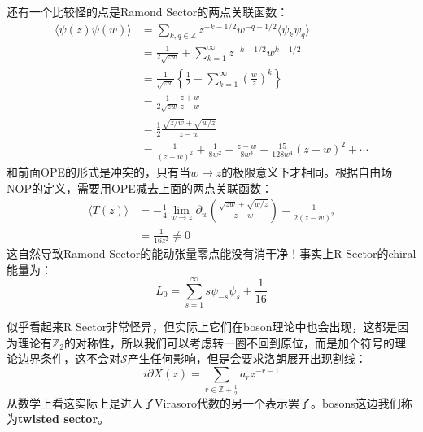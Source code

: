 还有一个比较怪的点是Ramond Sector的两点关联函数：
\begin{equation}
	\begin{aligned}
		\langle\psi(z)\psi(w)\rangle & =\sum_{k,q\in\mathbb{Z}}z^{-k-1/2}w^{-q-1/2}\langle \psi_k\psi_q\rangle   \\
		&=\frac1{2\sqrt{zw}}+\sum_{k=1}^\infty z^{-k-1/2}w^{k-1/2} \\
		&=\frac1{\sqrt{zw}}\left\{\frac12+\sum_{k=1}^\infty\left(\frac wz\right)^k\right\} \\
		&=\frac1{2\sqrt{zw}}\frac{z+w}{z-w} \\
		&=\frac12\frac{\sqrt{z/w}+\sqrt{w/z}}{z-w}\\
		&=\frac{1}{(z-w)^{2}}+\frac{1}{8w^{2}}-\frac{z-w}{8w^{3}}+\frac{15}{128w^{4}}(z-w)^{2}+\cdots 
	\end{aligned}
\end{equation}
和前面OPE的形式是冲突的，只有当$w\to z$的极限意义下才相同。根据自由场NOP的定义，需要用OPE减去上面的两点关联函数：
\begin{equation}
	\begin{aligned}\langle T(z)\rangle&=-\frac14\lim_{w\to z}\partial_w\left(\frac{\sqrt{zw}+\sqrt{w/z}}{z-w}\right)+\frac1{2(z-w)^2}\\&=\frac1{16z^2}\neq 0\end{aligned}
\end{equation}
这自然导致Ramond Sector的能动张量零点能没有消干净！事实上R Sector的chiral能量为：
\begin{equation}
	L_0=\sum_{s=1}^\infty s\psi_{-s}\psi_s+\frac{1}{16}
\end{equation}
\begin{remark}
	似乎看起来R Sector非常怪异，但实际上它们在boson理论中也会出现，这都是因为理论有$\mathbb{Z}_2$的对称性，所以我们可以考虑转一圈不回到原位，而是加个符号的理论边界条件，这不会对$\mathcal{S}$产生任何影响，但是会要求洛朗展开出现割线：
	\begin{equation}
		i\partial X(z)=\sum_{r\in\mathbb{Z}+\frac12}a_rz^{-r-1}
	\end{equation}
	从数学上看这实际上是进入了Virasoro代数的另一个表示罢了。bosons这边我们称为\textbf{twisted sector}。
\end{remark}
